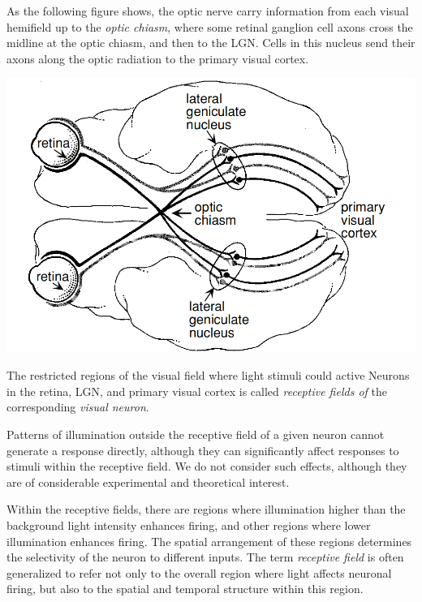 \begin{prin}
  \label{prin:visualPathway}
  As the following figure shows, the optic nerve carry information from each visual hemifield up to the \emph{optic chiasm}, where some retinal ganglion cell axons cross the midline at the optic chiasm, and then to the LGN. Cells in this nucleus send their axons along the optic radiation to the primary visual cortex.
  \begin{center}
    \includegraphics[scale=0.2]{./png/visualPathway}
  \end{center}
\end{prin}

\begin{defn}
  \label{def:visualReceptiveField}
  The restricted regions of the visual field where light stimuli could active Neurons in the retina, LGN, and primary visual cortex is called \emph{receptive fields of} the corresponding \emph{visual neuron}.
\end{defn}

\begin{asm}
  \label{asm:OutsideRecept}
  Patterns of illumination outside the receptive field of a given neuron cannot generate a response directly, although they can significantly affect responses to stimuli within the receptive field. We do not consider such effects, although they are of considerable experimental and theoretical interest.
\end{asm}

\begin{rem}
  Within the receptive fields, there are regions where illumination higher than the background light intensity enhances firing, and other regions where lower illumination enhances firing. The spatial arrangement of these regions determines the selectivity of the neuron to different inputs. The term \emph{receptive field} is often generalized to refer not only to the overall region where light affects neuronal firing, but also to the spatial and temporal structure within this region.
\end{rem}

